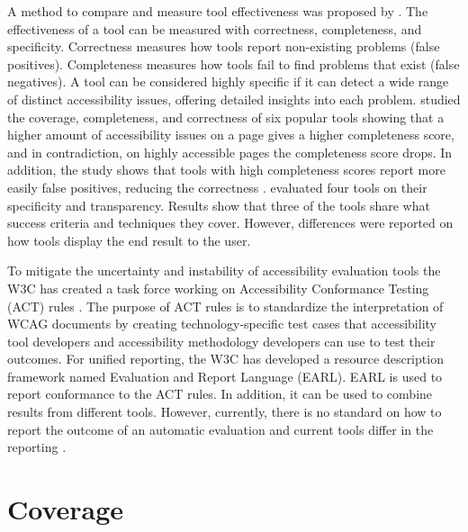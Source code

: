 A method to compare and measure tool effectiveness was proposed by \textcite{Brajnik2004}. The effectiveness of a tool can be measured with correctness, completeness, and specificity. Correctness measures how tools report non-existing problems (false positives). Completeness measures how tools fail to find problems that exist (false negatives). A tool can be considered highly specific if it can detect a wide range of distinct accessibility issues, offering detailed insights into each problem. \textcite{benchmark_aet} studied the coverage, completeness, and correctness of six popular tools showing that a higher amount of accessibility issues on a page gives a higher completeness score, and in contradiction, on highly accessible pages the completeness score drops. In addition, the study shows that tools with high completeness scores report more easily false positives, reducing the correctness \citep{benchmark_aet}. \textcite{tooltransparency} evaluated four tools on their specificity and transparency. Results show that three of the tools share what success criteria and techniques they cover. However, differences were reported on how tools display the end result to the user.

To mitigate the uncertainty and instability of accessibility evaluation tools the W3C has created a task force working on Accessibility Conformance Testing (ACT) rules \citep{act_overview}. The purpose of ACT rules is to standardize the interpretation of WCAG documents by creating technology-specific test cases that accessibility tool developers and accessibility methodology developers can use to test their outcomes. For unified reporting, the W3C has developed a resource description framework named Evaluation and Report Language (EARL). EARL is used to report conformance to the ACT rules. In addition, it can be used to combine results from different tools. However, currently, there is no standard on how to report the outcome of an automatic evaluation and current tools differ in the reporting \citep{tool_analysis_directive}.

\section{Coverage\label{coverage}}

